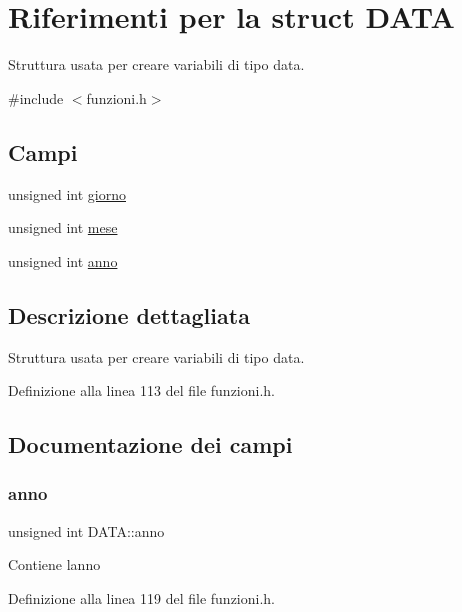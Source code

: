 \hypertarget{struct_d_a_t_a}{}\section{Riferimenti per la struct D\+A\+TA}
\label{struct_d_a_t_a}


Struttura usata per creare variabili di tipo data.  




{\ttfamily \#include $<$funzioni.\+h$>$}

\subsection*{Campi}
\begin{DoxyCompactItemize}
\item 
unsigned int \mbox{\hyperlink{struct_d_a_t_a_a5b7ee538f851d6654690c7abd5a73e95}{giorno}}
\item 
unsigned int \mbox{\hyperlink{struct_d_a_t_a_a01ae59e2eaf050acfab59d94732ab535}{mese}}
\item 
unsigned int \mbox{\hyperlink{struct_d_a_t_a_a51652b7ccc3b63d704943414ded3c38a}{anno}}
\end{DoxyCompactItemize}


\subsection{Descrizione dettagliata}
Struttura usata per creare variabili di tipo data. 

Definizione alla linea 113 del file funzioni.\+h.



\subsection{Documentazione dei campi}
\mbox{\label{struct_d_a_t_a_a51652b7ccc3b63d704943414ded3c38a}} 
\subsubsection{\texorpdfstring{anno}{anno}}
{\footnotesize\ttfamily unsigned int D\+A\+T\+A\+::anno}

Contiene l\textquotesingle{}anno 

Definizione alla linea 119 del file funzioni.\+h.



